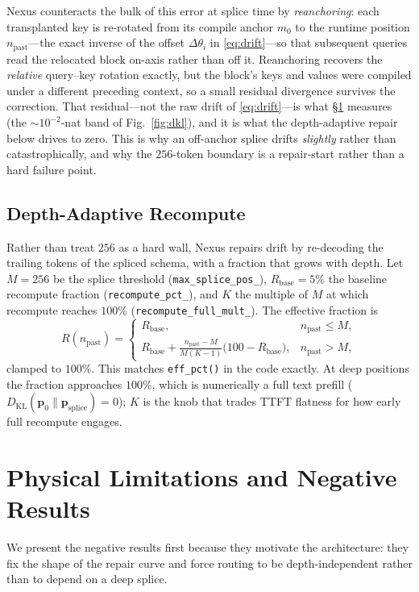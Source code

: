 \documentclass[10pt,conference]{IEEEtran}
\newcommand{\code}[1]{\texttt{\small #1}}
\begin{document}
Nexus counteracts the bulk of this error at splice time by \emph{reanchoring}: each
transplanted key is re-rotated from its compile anchor $m_0$ to the runtime position
$n_{\mathrm{past}}$---the exact inverse of the offset $\Delta\theta_i$ in
\eqref{eq:drift}---so that subsequent queries read the relocated block on-axis rather than
off it. Reanchoring recovers the \emph{relative} query--key rotation exactly, but the block's
keys and values were compiled under a different preceding context, so a small residual
divergence survives the correction. That residual---not the raw drift of \eqref{eq:drift}---is
what \S\ref{sec:limits} measures (the ${\sim}10^{-2}$-nat band of Fig.~\ref{fig:dkl}), and it
is what the depth-adaptive repair below drives to zero. This is why an off-anchor splice drifts
\emph{slightly} rather than catastrophically, and why the $256$-token boundary is a repair-start
rather than a hard failure point.

\subsection{Depth-Adaptive Recompute}
Rather than treat $256$ as a hard wall, Nexus repairs drift by re-decoding the trailing tokens
of the spliced schema, with a fraction that grows with depth. Let $M=256$ be the splice
threshold (\code{max\_splice\_pos\_}), $R_{\mathrm{base}}=5\%$ the baseline recompute fraction
(\code{recompute\_pct\_}), and $K$ the multiple of $M$ at which recompute reaches $100\%$
(\code{recompute\_full\_mult\_}). The effective fraction is
\begin{equation}
R(n_{\mathrm{past}})=
\begin{cases}
R_{\mathrm{base}}, & n_{\mathrm{past}}\le M,\\[2pt]
R_{\mathrm{base}}+\frac{n_{\mathrm{past}}-M}{M(K-1)}\bigl(100-R_{\mathrm{base}}\bigr), & n_{\mathrm{past}}>M,
\end{cases}
\label{eq:adaptive}
\end{equation}
clamped to $100\%$. This matches \code{eff\_pct()} in the code exactly. At deep positions the
fraction approaches $100\%$, which is numerically a full text prefill ($D_{\mathrm{KL}}(\mathbf{p}_0 \parallel \mathbf{p}_{\mathrm{splice}}) = 0$); $K$ is the
knob that trades TTFT flatness for how early full recompute engages.

\section{Physical Limitations and Negative Results}
\label{sec:limits}
We present the negative results first because they motivate the architecture: they fix the
shape of the repair curve and force routing to be depth-independent rather than to depend on a
deep splice.
\end{document}
